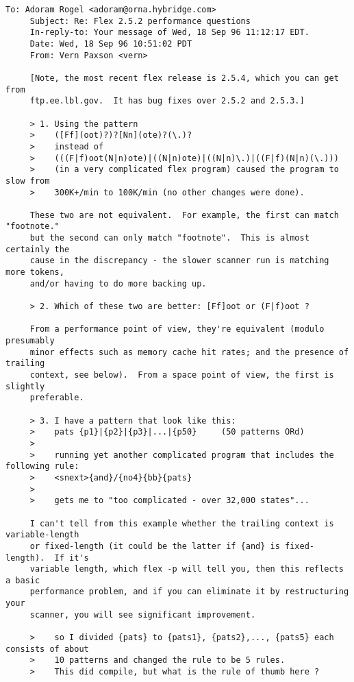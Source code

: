 \documentclass[openany,oneside]{book}
\begin{document}
\begin{verbatim}
To: Adoram Rogel <adoram@orna.hybridge.com>
     Subject: Re: Flex 2.5.2 performance questions
     In-reply-to: Your message of Wed, 18 Sep 96 11:12:17 EDT.
     Date: Wed, 18 Sep 96 10:51:02 PDT
     From: Vern Paxson <vern>
     
     [Note, the most recent flex release is 2.5.4, which you can get from
     ftp.ee.lbl.gov.  It has bug fixes over 2.5.2 and 2.5.3.]
     
     > 1. Using the pattern
     >    ([Ff](oot)?)?[Nn](ote)?(\.)?
     >    instead of
     >    (((F|f)oot(N|n)ote)|((N|n)ote)|((N|n)\.)|((F|f)(N|n)(\.)))
     >    (in a very complicated flex program) caused the program to slow from
     >    300K+/min to 100K/min (no other changes were done).
     
     These two are not equivalent.  For example, the first can match "footnote."
     but the second can only match "footnote".  This is almost certainly the
     cause in the discrepancy - the slower scanner run is matching more tokens,
     and/or having to do more backing up.
     
     > 2. Which of these two are better: [Ff]oot or (F|f)oot ?
     
     From a performance point of view, they're equivalent (modulo presumably
     minor effects such as memory cache hit rates; and the presence of trailing
     context, see below).  From a space point of view, the first is slightly
     preferable.
     
     > 3. I have a pattern that look like this:
     >    pats {p1}|{p2}|{p3}|...|{p50}     (50 patterns ORd)
     >
     >    running yet another complicated program that includes the following rule:
     >    <snext>{and}/{no4}{bb}{pats}
     >
     >    gets me to "too complicated - over 32,000 states"...
     
     I can't tell from this example whether the trailing context is variable-length
     or fixed-length (it could be the latter if {and} is fixed-length).  If it's
     variable length, which flex -p will tell you, then this reflects a basic
     performance problem, and if you can eliminate it by restructuring your
     scanner, you will see significant improvement.
     
     >    so I divided {pats} to {pats1}, {pats2},..., {pats5} each consists of about
     >    10 patterns and changed the rule to be 5 rules.
     >    This did compile, but what is the rule of thumb here ?
     

\end{verbatim}
\end{document}
